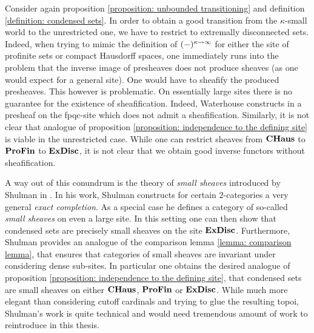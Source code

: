 \begin{remark}
	\label{remark: shulman's small sheaves and independence of the defining site}
	
	Consider again proposition \ref{proposition: unbounded transitioning} and definition \ref{definition: condensed sets}. In order to obtain a good transition from the $\kappa$-small world to the unrestricted one, we have to restrict to extremally disconnected sets. Indeed, when trying to mimic the definition of $(-)^{\kappa\rightsquigarrow \infty}$ for either the site of profinite sets or compact Hausdorff spaces, one immediately runs into the problem that the inverse image of presheaves does not produce sheaves (as one would expect for a general site). One would have to sheafify the produced presheaves. This however is problematic. On essentially large sites there is no guarantee for the existence of sheafification. Indeed, Waterhouse constructs in \cite{waterhouse} a presheaf on the fpqc-site which does not admit a sheafification. Similarly, it is not clear that analogue of proposition \ref{proposition: independence to the defining site} is viable in the unrestricted case. While one can restrict sheaves from ${{\mathbf{CHaus}}}$ to ${\mathbf{ProFin}}$ to ${\mathbf{ExDisc}}$, it is not clear that we obtain good inverse functors without sheafification.
	
	A way out of this conundrum is the theory of \emph{small sheaves} introduced by Shulman in \cite{shulman2012exactcompletionssmallsheaves}. In his work, Shulman constructs for certain $2$-categories a very general \emph{exact completion}. As a special case he defines a category of so-called \emph{small sheaves} on even a large site. In this setting one can then show that condensed sets are precisely small sheaves on the site ${\mathbf{ExDisc}}$. Furthermore, Shulman provides an analogue of the comparison lemma \ref{lemma: comparison lemma}, that ensures that categories of small sheaves are invariant under considering dense sub-sites. In particular one obtains the desired analogue of proposition \ref{proposition: independence to the defining site}, that condensed sets are small sheaves on either ${{\mathbf{CHaus}}}$, ${\mathbf{ProFin}}$ or ${\mathbf{ExDisc}}$. While much more elegant than considering cutoff cardinals  and trying to glue the resulting topoi, Shulman's work is quite technical and would need tremendous amount of work to reintroduce in this thesis.
\end{remark}

